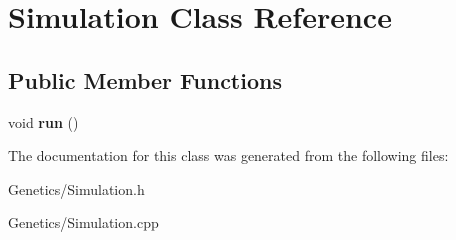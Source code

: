 \hypertarget{class_simulation}{}\section{Simulation Class Reference}
\label{class_simulation}
\subsection*{Public Member Functions}
\begin{DoxyCompactItemize}
\item 
void {\bfseries run} ()\hypertarget{class_simulation_ae5c367f87c0b5dc9740bc6d00e44e72c}{}\label{class_simulation_ae5c367f87c0b5dc9740bc6d00e44e72c}

\end{DoxyCompactItemize}


The documentation for this class was generated from the following files\+:\begin{DoxyCompactItemize}
\item 
Genetics/Simulation.\+h\item 
Genetics/Simulation.\+cpp\end{DoxyCompactItemize}
